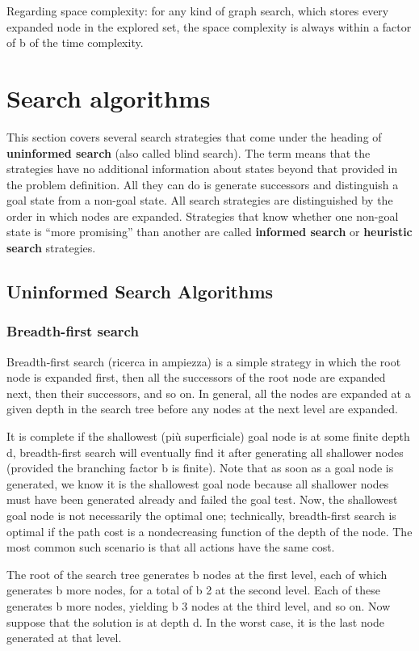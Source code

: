 Regarding space complexity: for any kind of graph search, which stores every expanded node in the explored set, the space complexity is always within a factor of b of the time complexity.

\section{Search algorithms}
This section covers several search strategies that come under the heading of \textbf{uninformed search} (also called blind search). The term means that the strategies have no additional information about states beyond that provided in the problem definition. All they can do is generate successors and distinguish a goal state from a non-goal state.
All search strategies are distinguished by the order in which nodes are expanded. Strategies that know whether one non-goal state is “more promising” than another are called \textbf{informed search} or \textbf{heuristic search} strategies.
\subsection{Uninformed Search Algorithms}
\subsubsection{Breadth-first search}
Breadth-first search (ricerca in ampiezza) is a simple strategy in which the root node is expanded first, then all the successors of the root node are expanded next, then their successors, and so on. In general,
all the nodes are expanded at a given depth in the search tree before any nodes at the next level are expanded.

It is complete if the shallowest (più superficiale) goal node is at some finite depth d, breadth-first search will eventually find it after generating all shallower nodes (provided the branching factor b is finite). Note that as soon as a goal node is generated, we know it is the shallowest goal node because all shallower nodes must have been generated already and failed the goal test. Now, the shallowest goal node is not necessarily the optimal one; technically, breadth-first search is optimal if the path cost is a nondecreasing function of the depth of the node. The most common such scenario is that all actions have the same cost.

The root of the search tree generates b nodes at the first level, each of which generates b more nodes, for a total of b 2 at the second level. Each of these generates b more nodes, yielding b 3 nodes at the third level, and so on. Now suppose that the solution is at depth d. In the worst case, it is the last node generated at that level.

